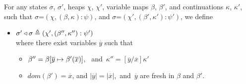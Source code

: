 

 
\begin{definition}
\label{d:adapt}
For any states $\sigma$, $\sigma'$, heaps $\chi$, $\chi'$, %
variable maps $\beta$, $\beta'$, 
and continuations $\kappa$, $\kappa'$, such that 
$\sigma$=$(\chi,(\beta,\kappa):\psi)$, and $\sigma$=$(\chi',(\beta',\kappa'):\psi')$, we define 
\begin{itemize}
\item $\sigma' \triangleleft \sigma \triangleq (\chi', (\beta'',\kappa'') : \psi')$ \\
where there exist variables $\overline{y}$ such that
\begin{itemize}
\item
$\beta'' =  \beta[\overline{y} \mapsto {{\beta'(\overline{x})}}]$, \ and\  $\kappa''=[\overline{y}/\overline{x}]\kappa'$
\item
$dom(\beta')=\overline{x}$,  and $|\overline{y}| = |\overline{x}|$,\  and\  $\overline{y}$ are fresh in $\beta$ and $\beta'$.
\end{itemize}
\end{itemize}
\end{definition}



